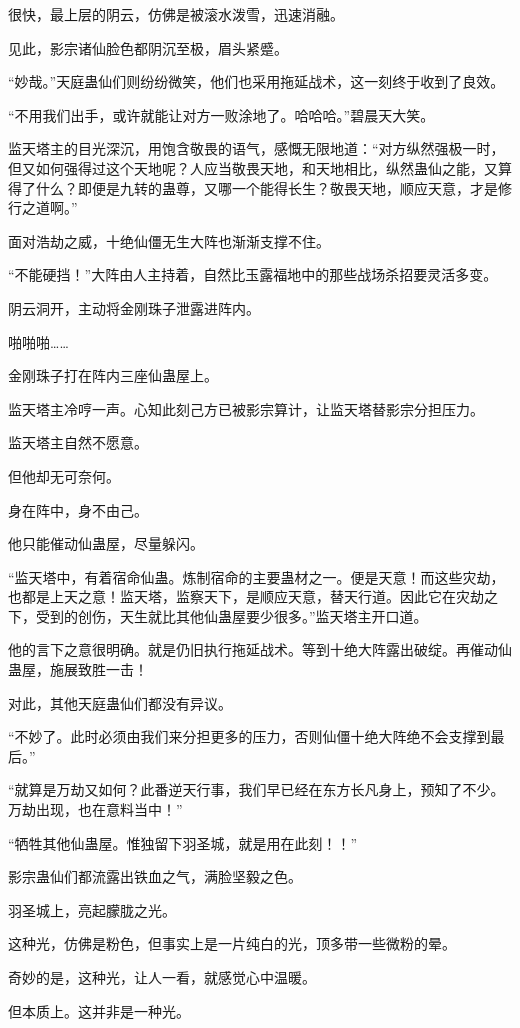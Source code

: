 \begin{this_body}
很快，最上层的阴云，仿佛是被滚水泼雪，迅速消融。

见此，影宗诸仙脸色都阴沉至极，眉头紧蹙。

“妙哉。”天庭蛊仙们则纷纷微笑，他们也采用拖延战术，这一刻终于收到了良效。

“不用我们出手，或许就能让对方一败涂地了。哈哈哈。”碧晨天大笑。

监天塔主的目光深沉，用饱含敬畏的语气，感慨无限地道：“对方纵然强极一时，但又如何强得过这个天地呢？人应当敬畏天地，和天地相比，纵然蛊仙之能，又算得了什么？即便是九转的蛊尊，又哪一个能得长生？敬畏天地，顺应天意，才是修行之道啊。”

面对浩劫之威，十绝仙僵无生大阵也渐渐支撑不住。

“不能硬挡！”大阵由人主持着，自然比玉露福地中的那些战场杀招要灵活多变。

阴云洞开，主动将金刚珠子泄露进阵内。

啪啪啪……

金刚珠子打在阵内三座仙蛊屋上。

监天塔主冷哼一声。心知此刻己方已被影宗算计，让监天塔替影宗分担压力。

监天塔主自然不愿意。

但他却无可奈何。

身在阵中，身不由己。

他只能催动仙蛊屋，尽量躲闪。

“监天塔中，有着宿命仙蛊。炼制宿命的主要蛊材之一。便是天意！而这些灾劫，也都是上天之意！监天塔，监察天下，是顺应天意，替天行道。因此它在灾劫之下，受到的创伤，天生就比其他仙蛊屋要少很多。”监天塔主开口道。

他的言下之意很明确。就是仍旧执行拖延战术。等到十绝大阵露出破绽。再催动仙蛊屋，施展致胜一击！

对此，其他天庭蛊仙们都没有异议。

“不妙了。此时必须由我们来分担更多的压力，否则仙僵十绝大阵绝不会支撑到最后。”

“就算是万劫又如何？此番逆天行事，我们早已经在东方长凡身上，预知了不少。万劫出现，也在意料当中！”

“牺牲其他仙蛊屋。惟独留下羽圣城，就是用在此刻！！”

影宗蛊仙们都流露出铁血之气，满脸坚毅之色。

羽圣城上，亮起朦胧之光。

这种光，仿佛是粉色，但事实上是一片纯白的光，顶多带一些微粉的晕。

奇妙的是，这种光，让人一看，就感觉心中温暖。

但本质上。这并非是一种光。


\end{this_body}

